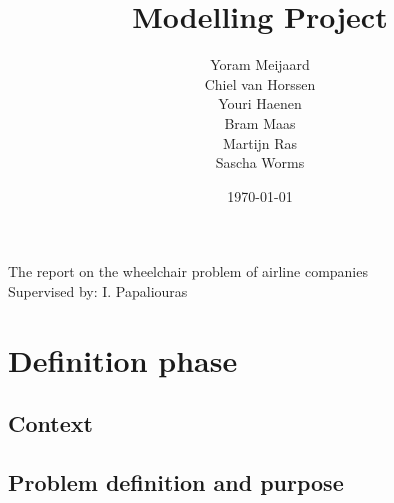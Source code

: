 \documentclass[a4paper, 12pt, notitlepage]{report}
\title{{\Huge Modelling Project} \vspace{300pt}} %
\author{Yoram Meijaard\\Chiel van Horssen\\Youri Haenen\\Bram Maas\\Martijn Ras\\Sascha Worms} %
\date{\today} %
\begin{document}
\maketitle
\begin{center}
The report on the wheelchair problem of airline companies %
\\[12pt]
Supervised by: I. Papaliouras  %
\end{center}
\thispagestyle{empty}
\newpage



\tableofcontents




\chapter{Definition phase}
\section{Context}


\section{Problem definition and purpose}
\end{document}
